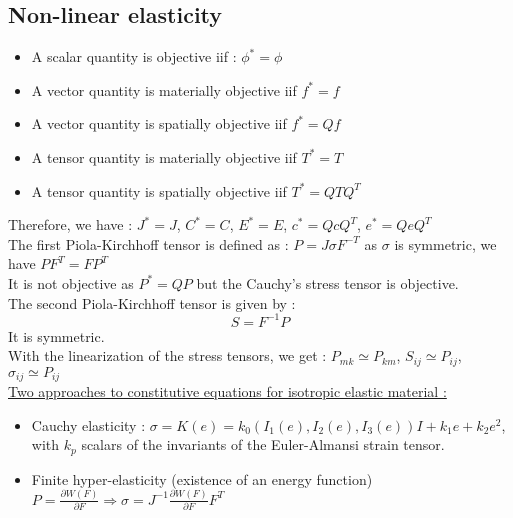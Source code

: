 \documentclass[../main.tex]{subfiles}
\begin{document}
\subsection{Non-linear elasticity}
\begin{itemize}
    \item A scalar quantity is objective iif : $\phi^* = \phi$\\
    \item A vector quantity is materially objective iif $f^* = f$\\
    \item A vector quantity is spatially objective iif $f^* = Qf$\\
    \item A tensor quantity is materially objective iif $T^* = T$\\
    \item A tensor quantity is spatially objective iif $T^* = QTQ^T$\\  
\end{itemize}

Therefore, we have : $J^* = J$, $C^* = C$, $E^* = E$, $c^* = QcQ^T$, $e^* = QeQ^T$\\

The first Piola-Kirchhoff tensor is defined as : $P = J\sigma F^{-T}$ as $\sigma$ is symmetric, we have $PF^T = FP^T$\\


It is not objective as $P^* = QP$ but the Cauchy's stress tensor is objective.\\

The second Piola-Kirchhoff tensor is given by : \begin{equation}
    S = F^{-1}P
\end{equation}
It is symmetric.\\

With the linearization of the stress tensors, we get : $P_{mk} \simeq P_{km}$, $S_{ij} \simeq P_{ij}$, $\sigma_{ij} \simeq P_{ij}$\\

\underline{Two approaches to constitutive equations for isotropic elastic material :}\\ \begin{itemize}
    \item Cauchy elasticity : $\sigma = K(e) = k_0 (I_1(e), I_2(e), I_3(e)) I + k_1 e + k_2 e^2$, with $k_p$ scalars of the invariants of the Euler-Almansi strain tensor.\\
    \item Finite hyper-elasticity (existence of an energy function) $P = \frac{\partial W(F)}{\partial F} \Rightarrow \sigma = J^{-1} \frac{\partial W(F)}{\partial F} F^T$\\
\end{itemize}
\end{document}
